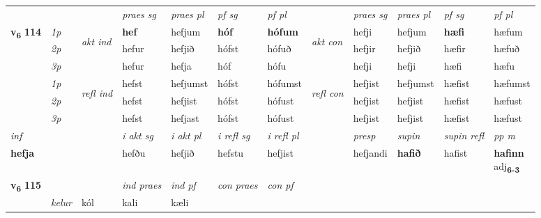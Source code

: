\begin{longtable}[l]{X>{\footnotesize\itshape}llXXXXlXXXX}
 & &   & \textit{praes sg}  & \textit{praes pl}    & \textit{ pf sg} & \textit{pf pl} & & \textit{praes sg}  & \textit{praes pl}    & \textit{pf sg} & \textit{pf pl }  \\ \cmidrule{4-7} \cmidrule{9-12}
 \multirow{2}{*}{{{\textbf{v{\textsubscript{6}}} \Large{\textbf{114}}}}}  & 1p & \multirow{3}{*}{\begin{turn}{90}\textit{akt ind}\end{turn}} & \textbf{hef} & hefjum & \textbf{hóf} & \textbf{hófum} & \multirow{3}{*}{\begin{turn}{90}\textit{akt con}\end{turn}} &hefji & hefjum & \textbf{hæfi} & hæfum\\*
 & 2p &  &  hefur  & hefjið & hófst & hófuð & & hefjir & hefjið & hæfir & hæfuð \\*
 & 3p &  & hefur & hefja & hóf & hófu & & hefji & hefji& hæfi & hæfu \\*
\cmidrule{4-7} \cmidrule{9-12}
 & 1p & \multirow{3}{*}{\begin{turn}{90}\textit{refl ind}\end{turn}}  & hefst & hefjumst & hófst & hófumst & \multirow{3}{*}{\begin{turn}{90}\textit{refl con}\end{turn}}  &hefjist & hefjumst & hæfist & hæfumst \\*
 & 2p &  & hefst & hefjist & hófst & hófust & &hefjist & hefjist & hæfist & hæfust \\*
 & 3p  & & hefst & hefjast & hófst & hófust & & hefjist & hefjist& hæfist & hæfust \\*
\cmidrule{4-7} \cmidrule{9-12}

   {\textit{inf}} & &  & \textit{i akt sg} & \textit{i akt pl} & \textit{i refl sg} & \textit{i refl pl} && \textit{presp} & \textit{supin} & \textit{supin refl} & \textit{pp m} \\*
  {\textbf{hefja}} & && hefðu  & hefjið & hefstu & hefjist && hefjandi &  \textbf{hafið} & hafist & \specialcell{\textbf{hafinn} \\ adj\textbf{\textsubscript{6-3}}} \\*

\midrule

\multirow{2}{*}{{{\textbf{v{\textsubscript{6}}} \Large{\textbf{115}}}}}  &&&  \textit{ind praes} & \textit{ind pf} & \textit{con praes} & \textit{con pf} \\*
\multicolumn{3}{r}{\textit{e-n}} & kelur & kól & kali & kæli \\*


\end{longtable}
